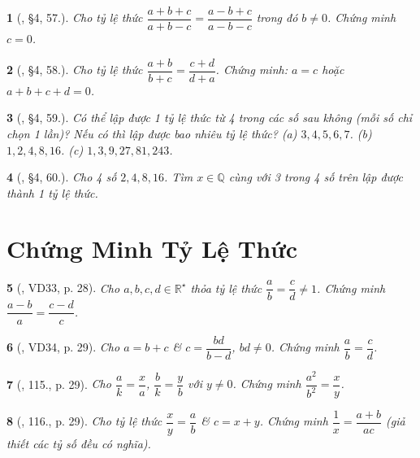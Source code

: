 \documentclass{article}
\newtheorem{baitoan}{}
\begin{document}
\begin{baitoan}[\cite{Binh_Toan_7_tap_1}, \S4, 57.]
	Cho tỷ lệ thức $\dfrac{a + b + c}{a + b - c} = \dfrac{a - b + c}{a - b - c}$ trong đó $b\ne 0$. Chứng minh $c = 0$.
\end{baitoan}

\begin{baitoan}[\cite{Binh_Toan_7_tap_1}, \S4, 58.]
	Cho tỷ lệ thức $\dfrac{a + b}{b + c} = \dfrac{c + d}{d + a}$. Chứng minh: $a = c$ hoặc $a + b + c + d = 0$.
\end{baitoan}

\begin{baitoan}[\cite{Binh_Toan_7_tap_1}, \S4, 59.]
	Có thể lập được 1 tỷ lệ thức từ 4 trong các số sau không (mỗi số chỉ chọn 1 lần)? Nếu có thì lập được bao nhiêu tỷ lệ thức? (a) $3,4,5,6,7$. (b) $1,2,4,8,16$. (c) $1,3,9,27,81,243$.	
\end{baitoan}

\begin{baitoan}[\cite{Binh_Toan_7_tap_1}, \S4, 60.]
	Cho 4 số $2,4,8,16$. Tìm $x\in\mathbb{Q}$ cùng với 3 trong 4 số trên lập được thành 1 tỷ lệ thức.
\end{baitoan}


\section{Chứng Minh Tỷ Lệ Thức}

\begin{baitoan}[\cite{Tuyen_Toan_7}, VD33, p. 28]
	Cho $a,b,c,d\in\mathbb{R}^\star$ thỏa tỷ lệ thức $\dfrac{a}{b} = \dfrac{c}{d}\ne 1$. Chứng minh $\dfrac{a - b}{a} = \dfrac{c - d}{c}$.
\end{baitoan}

\begin{baitoan}[\cite{Tuyen_Toan_7}, VD34, p. 29]
	Cho $a = b + c$ \& $c = \dfrac{bd}{b - d}$, $bd\ne 0$. Chứng minh $\dfrac{a}{b} = \dfrac{c}{d}$.
\end{baitoan}

\begin{baitoan}[\cite{Tuyen_Toan_7}, 115., p. 29]
	Cho $\dfrac{a}{k} = \dfrac{x}{a}$, $\dfrac{b}{k} = \dfrac{y}{b}$ với $y\ne 0$. Chứng minh $\dfrac{a^2}{b^2} = \dfrac{x}{y}$.
\end{baitoan}

\begin{baitoan}[\cite{Tuyen_Toan_7}, 116., p. 29]
	Cho tỷ lệ thức $\dfrac{x}{y} = \dfrac{a}{b}$ \& $c = x + y$. Chứng minh $\dfrac{1}{x} = \dfrac{a + b}{ac}$ (giả thiết các tỷ số đều có nghĩa).
\end{baitoan}
\end{document}
